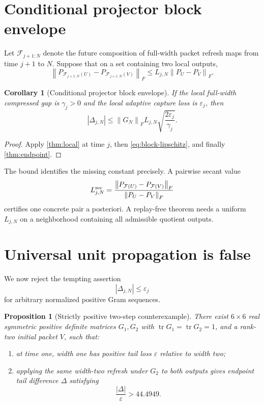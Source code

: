 \documentclass[11pt]{article}
\newtheorem{proposition}[theorem]{Proposition}
\newtheorem{corollary}[theorem]{Corollary}
\theoremstyle{definition}
\theoremstyle{remark}
\newcommand{\norm}[1]{\left\lVert#1\right\rVert}
\newcommand{\tr}{\operatorname{tr}}
\begin{document}
\section{Conditional projector block envelope}
\label{sec:conditional}

Let $\mathcal F_{j+1:N}$ denote the future composition of full-width packet
refresh maps from time $j+1$ to $N$.  Suppose that on a set containing two
local outputs,
\begin{equation}
 \norm{P_{\mathcal F_{j+1:N}(U)}
            -P_{\mathcal F_{j+1:N}(V)}}_F
 \le L_{j,N}\norm{P_U-P_V}_F.
 \label{eq:block-lipschitz}
\end{equation}

\begin{corollary}[Conditional projector block envelope]
\label{cor:conditional}
If the local full-width compressed gap is $\gamma_j>0$ and the local
adaptive capture loss is $\varepsilon_j$, then
\begin{equation}
 |\Delta_{j,N}|
 \le\norm{G_N}_F L_{j,N}
 \sqrt{\frac{2\varepsilon_j}{\gamma_j}}.
 \label{eq:conditional}
\end{equation}
\end{corollary}

\begin{proof}
Apply \cref{thm:local} at time $j$, then
\eqref{eq:block-lipschitz}, and finally \cref{thm:endpoint}.
\end{proof}

The bound identifies the missing constant precisely.  A pairwise secant
value
\[
 L_{j,N}^{\rm sec}
 =\frac{\norm{P_{\mathcal F(U)}-P_{\mathcal F(V)}}_F}
 {\norm{P_U-P_V}_F}
\]
certifies one concrete pair a posteriori.  A replay-free theorem needs a
uniform $L_{j,N}$ on a neighborhood containing all admissible quotient
outputs.

\section{Universal unit propagation is false}
\label{sec:counterexample}

We now reject the tempting assertion
\[
 |\Delta_{j,N}|\le\varepsilon_j
\]
for arbitrary normalized positive Gram sequences.

\begin{proposition}[Strictly positive two-step counterexample]
\label{prop:counterexample}
There exist $6\times6$ real symmetric positive definite matrices
$G_1,G_2$ with $\tr G_1=\tr G_2=1$, and a rank-two initial packet $V$, such
that:
\begin{enumerate}[leftmargin=2em]
\item at time one, width one has positive tail loss $\varepsilon$ relative to
width two;
\item applying the same width-two refresh under $G_2$ to both outputs gives
endpoint tail difference $\Delta$ satisfying
\[
 \frac{|\Delta|}{\varepsilon}>44.4949.
\]
\end{enumerate}
\end{proposition}
\end{document}
